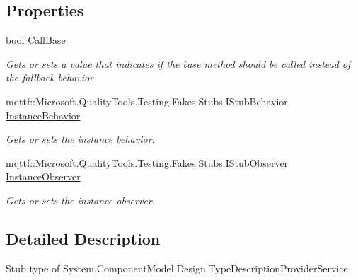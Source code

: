 \subsection*{Properties}
\begin{DoxyCompactItemize}
\item 
bool \hyperlink{class_system_1_1_component_model_1_1_design_1_1_fakes_1_1_stub_type_description_provider_service_a2836efffd64b45f245c0687d59eabb90}{Call\-Base}
\begin{DoxyCompactList}\small\item\em Gets or sets a value that indicates if the base method should be called instead of the fallback behavior\end{DoxyCompactList}\item 
mqttf\-::\-Microsoft.\-Quality\-Tools.\-Testing.\-Fakes.\-Stubs.\-I\-Stub\-Behavior \hyperlink{class_system_1_1_component_model_1_1_design_1_1_fakes_1_1_stub_type_description_provider_service_a14dd8b109609ed0ed1eb9179b8ea8274}{Instance\-Behavior}
\begin{DoxyCompactList}\small\item\em Gets or sets the instance behavior.\end{DoxyCompactList}\item 
mqttf\-::\-Microsoft.\-Quality\-Tools.\-Testing.\-Fakes.\-Stubs.\-I\-Stub\-Observer \hyperlink{class_system_1_1_component_model_1_1_design_1_1_fakes_1_1_stub_type_description_provider_service_a1ba2e13c56ea797d4660b49b666286ea}{Instance\-Observer}
\begin{DoxyCompactList}\small\item\em Gets or sets the instance observer.\end{DoxyCompactList}\end{DoxyCompactItemize}


\subsection{Detailed Description}
Stub type of System.\-Component\-Model.\-Design.\-Type\-Description\-Provider\-Service



